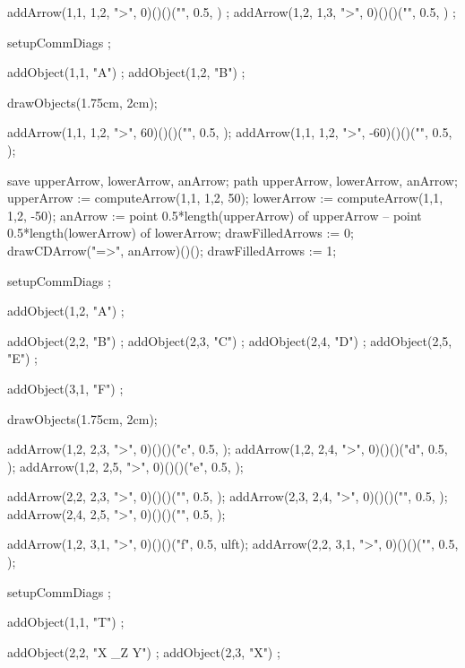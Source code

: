   addArrow(1,1, 1,2, ">", 0)()()("", 0.5, ) ;
  addArrow(1,2, 1,3, ">", 0)()()("", 0.5, ) ;
\stopMPcode\stopformula
\stopbuffer

\processTEXbuffer

\typebuffer

\startbuffer
\startformula{}
  setupCommDiags ;
  
  addObject(1,1, "A") ;
  addObject(1,2, "B") ;
  
  drawObjects(1.75cm, 2cm);
  
  addArrow(1,1, 1,2, ">",  60)()()("", 0.5, );
  addArrow(1,1, 1,2, ">", -60)()()("", 0.5, );
  
  save upperArrow, lowerArrow, anArrow;
  path upperArrow, lowerArrow, anArrow;
  upperArrow := computeArrow(1,1, 1,2,  50);
  lowerArrow := computeArrow(1,1, 1,2, -50);
  anArrow    := 
    point 0.5*length(upperArrow) of upperArrow --
    point 0.5*length(lowerArrow) of lowerArrow;
  drawFilledArrows := 0;
  drawCDArrow("=>", anArrow)()();
  drawFilledArrows := 1;
\stopMPcode\stopformula
\stopbuffer

\processTEXbuffer

\typebuffer

\startbuffer
\startformula{}
  setupCommDiags ;
  
  addObject(1,2, "A") ;
  
  addObject(2,2, "B") ;
  addObject(2,3, "C") ;
  addObject(2,4, "D") ;
  addObject(2,5, "E") ;
  
  addObject(3,1, "F") ;
  
  drawObjects(1.75cm, 2cm);
  
  addArrow(1,2, 2,3, ">", 0)()()("c", 0.5, );
  addArrow(1,2, 2,4, ">", 0)()()("d", 0.5, );
  addArrow(1,2, 2,5, ">", 0)()()("e", 0.5, );

  addArrow(2,2, 2,3, ">", 0)()()("", 0.5, );
  addArrow(2,3, 2,4, ">", 0)()()("", 0.5, );
  addArrow(2,4, 2,5, ">", 0)()()("", 0.5, );
  
  addArrow(1,2, 3,1, ">", 0)()()("f", 0.5, ulft);
  addArrow(2,2, 3,1, ">", 0)()()("",  0.5, );
\stopMPcode\stopformula
\stopbuffer

\processTEXbuffer

\typebuffer

\startbuffer
\startformula{}
  setupCommDiags ;
  
  addObject(1,1, "T") ;
  
  addObject(2,2, "X \times_Z Y") ;
  addObject(2,3, "X") ;
  
